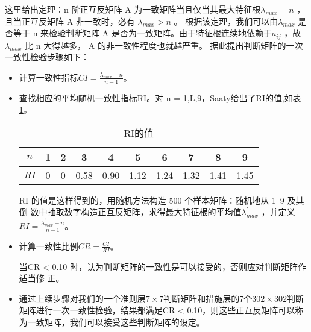 \documentclass{cumcmthesis}
\begin{document}
这里给出定理：n 阶正互反矩阵 A 为一致矩阵当且仅当其最大特征根$\lambda_{max} = n$ ，且当正互反矩阵 A 非一致时，必有 $\lambda_{max}> n$ 。 根据该定理，我们可以由$\lambda_{max}$ 是否等于 n 来检验判断矩阵 A 是否为一致矩阵。由于特征根连续地依赖于$a_{ij}$ ，故 $\lambda_{max}$ 比 n 大得越多， A 的非一致性程度也就越严重。
据此提出判断矩阵的一次一致性检验步骤如下：
\begin{itemize}
    \item 计算一致性指标$CI = \frac{\lambda_{max}-n}{n-1}$。
    \item 查找相应的平均随机一致性指标RI。对 n = 1,L,9，Saaty给出了RI的值,如表\ref{RIde}。
    \begin{table}[H]
        \label{tablesymbol}
        \centering
        \begin{tabular}{c|ccccccccc}   
        \hline 
        $n$  &  1 & 2 & 3 & 4 & 5 & 6 & 7 & 8 & 9\\
        \hline
        $RI$  &  0 & 0 & 0.58 & 0.90 & 1.12 & 1.24 & 1.32 & 1.41 & 1.45\\
        \hline
        \end{tabular}
        \caption{RI的值}
        \label{RIde}
    
    \end{table}
    RI 的值是这样得到的，用随机方法构造 500 个样本矩阵：随机地从 1~9 及其倒
数中抽取数字构造正互反矩阵，求得最大特征根的平均值$\lambda^{'}_{max}$ ，并定义$RI = \frac{\lambda^{'}_{max}-n}{n-1}$。
    \item 计算一致性比例$CR = \frac{CI}{RI}$。
    
    当CR < 0.10 时，认为判断矩阵的一致性是可以接受的，否则应对判断矩阵作适当修
正。
    \item 通过上续步骤对我们的一个准则层$7 \times 7$判断矩阵和措施层的7个$302 \times 302$判断矩阵进行一次一致性检验，结果都满足CR < 0.10，则这些正互反矩阵可以称为一致矩阵，我们可以接受这些判断矩阵的设定。 
\end{itemize}
\end{document}
